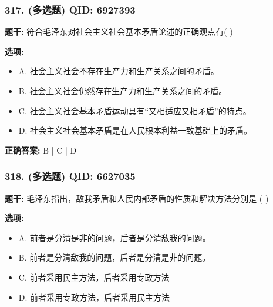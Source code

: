 \documentclass[12pt,UTF8]{ctexart}
\begin{document}
\vspace{0.3em}\hrulefill\vspace{0.7em}

\subsubsection*{317. (多选题) \small QID: 6927393}

\textbf{题干:}
符合毛泽东对社会主义社会基本矛盾论述的正确观点有(      )

\textbf{选项:}
\begin{itemize}[leftmargin=*]

  \item A. 社会主义社会不存在生产力和生产关系之间的矛盾。

  \item B. 社会主义社会仍然存在生产力和生产关系之间的矛盾。

  \item C. 社会主义社会基本矛盾运动具有“又相适应又相矛盾”的特点。

  \item D. 社会主义社会基本矛盾是在人民根本利益一致基础上的矛盾。

\end{itemize}

\textbf{正确答案:}
B | C | D

\vspace{0.3em}\hrulefill\vspace{0.7em}

\subsubsection*{318. (多选题) \small QID: 6627035}

\textbf{题干:}
毛泽东指出，敌我矛盾和人民内部矛盾的性质和解决方法分别是  ( )

\textbf{选项:}
\begin{itemize}[leftmargin=*]

  \item A. 前者是分清是非的问题，后者是分清敌我的问题。

  \item B. 前者是分清敌我的问题，后者是分清是非的问题。

  \item C. 前者采用民主方法，后者采用专政方法

  \item D. 前者采用专政方法，后者采用民主方法

\end{itemize}
\end{document}
